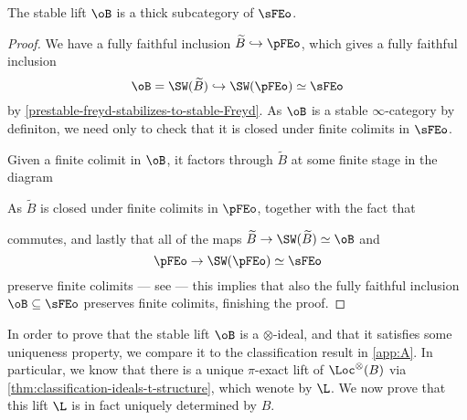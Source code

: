 \begin{lemma}
    \label{lm:stable-lift-is-thick}
    The stable lift $\oB$ is a thick subcategory of $\sFEo$. 
\end{lemma}
\begin{proof}
    We have a fully faithful inclusion $\widetilde{B}\hookrightarrow\pFEo$, which gives a fully faithful inclusion 
    \[\oB = \SW(\widetilde{B})\hookrightarrow \SW(\pFEo)\simeq \sFEo\]
    by \cref{prestable-freyd-stabilizes-to-stable-Freyd}. As $\oB$ is a stable $\infty$-category by definiton, we need only to check that it is closed under finite colimits in $\sFEo$. 
    
    Given a finite colimit in $\oB$, it factors through $\widetilde{B}$ at some finite stage in the diagram 
    \begin{center}
    \end{center}
    As $\widetilde{B}$ is closed under finite colimits in $\pFEo$, together with the fact that
    \begin{center}
    \end{center}
    commutes, and lastly that all of the maps $\widetilde{B}\to \SW(\widetilde{B})\simeq \oB$ and 
    \[\pFEo \to \SW(\pFEo)\simeq \sFEo\] 
    preserve finite colimits --- see \cite[C.1.1.5]{lurie_SAG} --- this implies that also the fully faithful inclusion $\oB \subseteq \sFEo$ preserves finite colimits, finishing the proof. 
\end{proof}

In order to prove that the stable lift $\oB$ is a $\otimes$-ideal, and that it satisfies some uniqueness property, we compare it to the classification result in \cref{app:A}. In particular, we know that there is a unique $\pi$-exact lift of $\Loc^\otimes(B)$ via \cref{thm:classification-ideals-t-structure}, which wenote by $\L$. We now prove that this lift $\L$ is in fact uniquely determined by $B$. 

